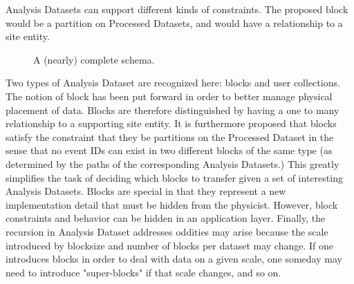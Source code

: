 \documentclass{cmspaper}
\begin{document}
Analysis Datasets can support different kinds of constraints.  The proposed 
block would be a partition on Processed Datasets, and would have a 
relationship to a site entity.  
\begin{figure}[hbtp]
  \begin{center}
    \caption{A (nearly) complete schema.}
    \label{fig:detailed}
  \end{center}
\end{figure}
Two types of Analysis Dataset are recognized here: blocks and user collections.  The 
notion of block has been put forward in order to better manage physical placement of data.  
Blocks are therefore distinguished by having a one to many relationship to a supporting site 
entity.  It is furthermore proposed that blocks satisfy the constraint that they be 
partitions on the Processed Dataset in the sense that no event IDs
can exist in two different blocks of the same type (as determined by the paths of the 
corresponding Analysis Datasets.) This greatly simplifies the task of deciding which 
blocks to transfer given a set of interesting Analysis Datasets.
Blocks are special in that they represent a new implementation detail 
that must be hidden from the physicist.  However, block constraints and behavior can be 
hidden in an application layer.  Finally, the recursion in Analysis Dataset 
addresses oddities may arise 
because the scale introduced by blocksize and number of blocks per dataset may change.  
If one introduces blocks in order to deal with data on a given scale, one someday may need 
to introduce "super-blocks" if that scale changes, and so on. 
\end{document}
